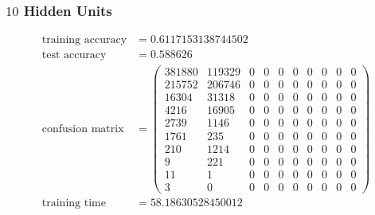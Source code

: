 \documentclass[11pt]{article}
\begin{document}
\subsubsection{$10$ Hidden Units}
\begin{equation}
  \begin{split}
    \text{training accuracy} &= 0.6117153138744502\\
    \text{test accuracy} &= 0.588626\\
    \text{confusion matrix} &=
    \begin{pmatrix}
      381880 & 119329 & 0 & 0 & 0 & 0 & 0 & 0 & 0 & 0 \\
      215752 & 206746 & 0 & 0 & 0 & 0 & 0 & 0 & 0 & 0 \\
      16304  & 31318  & 0 & 0 & 0 & 0 & 0 & 0 & 0 & 0 \\
      4216   & 16905  & 0 & 0 & 0 & 0 & 0 & 0 & 0 & 0 \\
      2739   & 1146   & 0 & 0 & 0 & 0 & 0 & 0 & 0 & 0 \\
      1761   & 235    & 0 & 0 & 0 & 0 & 0 & 0 & 0 & 0 \\
      210    & 1214   & 0 & 0 & 0 & 0 & 0 & 0 & 0 & 0 \\
      9      & 221    & 0 & 0 & 0 & 0 & 0 & 0 & 0 & 0 \\
      11     & 1      & 0 & 0 & 0 & 0 & 0 & 0 & 0 & 0 \\
      3      & 0      & 0 & 0 & 0 & 0 & 0 & 0 & 0 & 0
    \end{pmatrix}\\
    \text{training time} &= 58.18630528450012
  \end{split}
\end{equation}
\end{document}
